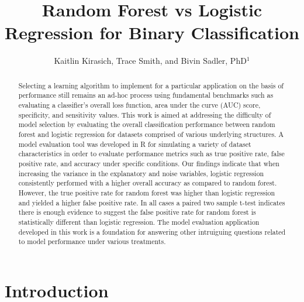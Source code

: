 \documentclass{llncs}
\title{\textbf{Random Forest vs Logistic Regression for Binary Classification}}
\author{Kaitlin Kirasich, Trace Smith, and Bivin Sadler, PhD$^1$}
\institute{$^1$Master of Science in Data Science \\ Southern Methodist University \\ Dallas, Texas USA \\
\email{kkirasich@.smu.edu,traces@smu.edu,bsadler@smu.edu}}
\begin{document}
\maketitle

\begin{abstract} 
Selecting a learning algorithm to implement for a particular application on the basis of performance still remains an ad-hoc process using fundamental benchmarks such as evaluating a classifier’s overall loss function, area under the curve (AUC) score, specificity, and sensitivity values. This work is aimed at addressing the difficulty of model selection by evaluating the overall classification performance between random forest and logistic regression for datasets comprised of various underlying structures. A model evaluation tool was developed in R for simulating a variety of dataset characteristics in order to evaluate performance metrics such as true positive rate, false positive rate, and accuracy under specific conditions. Our findings indicate that when increasing the variance in the explanatory and noise variables, logistic regression consistently performed with a higher overall accuracy as compared to random forest.  However, the true positive rate for random forest was higher than logistic regression and yielded a higher false positive rate. In all cases a paired two sample t-test indicates there is enough evidence to suggest the false positive rate for random forest is statistically different than logistic regression. The model evaluation application developed in this work is a foundation for answering other intruiguing questions related to model performance under various treatments. 

\end{abstract}


\section{Introduction}
\end{document}
